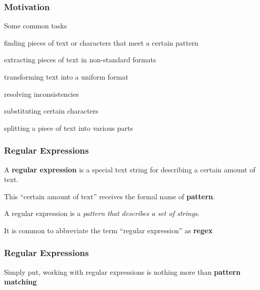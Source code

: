 \documentclass[12pt]{beamer}\usepackage[]{graphicx}\usepackage[]{color}
\begin{document}
\begin{frame}[fragile]
\frametitle{Motivation}

Some common tasks
\bi
  \item finding pieces of text or characters that meet a certain pattern
  \item extracting pieces of text in non-standard formats
  \item transforming text into a uniform format
  \item resolving inconsistencies
  \item substituting certain characters
  \item splitting a piece of text into various parts
\ei

\end{frame}


\begin{frame}
\begin{center}
\Huge{}
\end{center}
\end{frame}


\begin{frame}
\frametitle{Regular Expressions}

\bbi
  \item A \textbf{regular expression} is a special text string for describing a certain amount of text.
  \item This ``certain amount of text'' receives the formal name of \textbf{pattern}. 
  \item A regular expression is a \textit{pattern that describes a set of strings}.
  \item It is common to abbreviate the term ``regular expression'' as \textbf{regex}
\ei

\end{frame}


\begin{frame}
\frametitle{Regular Expressions}

{\Large Simply put, working with regular expressions is nothing more than \textbf{pattern matching}}

\end{frame}

\end{document}
